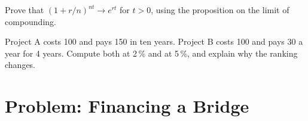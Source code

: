 \begin{exercise}[$\star\star\star$]\label{exo:g12:present-value:14}
Prove that $(1 + r/n)^{nt} \to e^{rt}$ for $t > 0$, using the proposition on the limit of compounding.
\end{exercise}

\begin{exercise}[$\star\star\star$]\label{exo:g12:present-value:15}
Project A costs 100 and pays 150 in ten years. Project B costs 100 and pays 30 a year for 4 years. Compute both  at 2\,\% and at 5\,\%, and explain why
the ranking changes.
\end{exercise}

\section{Problem: Financing a Bridge}

